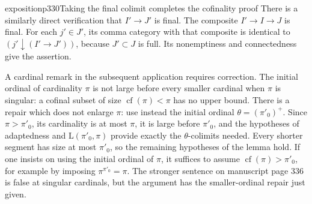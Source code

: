 \begin{dcomment}{exposition}{p330}{Taking the final colimit completes the cofinality proof}
There is a similarly direct verification that $I'\to J'$ is final. The composite $I'\to I\to J$ is final. For each $j'\in J'$, its comma category with that composite is identical to $(j'\downarrow (I'\to J'))$, because $J'\subset J$ is full. Its nonemptiness and connectedness give the assertion.

A cardinal remark in the subsequent application requires correction. The initial ordinal of cardinality $\pi$ is not large before every smaller cardinal when $\pi$ is singular: a cofinal subset of size $\operatorname{cf}(\pi)<\pi$ has no upper bound. There is a repair which does not enlarge $\pi$: use instead the initial ordinal $\theta=(\pi'_0)^+$. Since $\pi>\pi'_0$, its cardinality is at most $\pi$, it is large before $\pi'_0$, and the hypotheses of adaptedness and $\mathrm L(\pi'_0,\pi)$ provide exactly the $\theta$-colimits needed. Every shorter segment has size at most $\pi'_0$, so the remaining hypotheses of the lemma hold. If one insists on using the initial ordinal of $\pi$, it suffices to assume $\operatorname{cf}(\pi)>\pi'_0$, for example by imposing $\pi^{\pi'_0}=\pi$. The stronger sentence on manuscript page 336 is false at singular cardinals, but the argument has the smaller-ordinal repair just given.
\end{dcomment}

